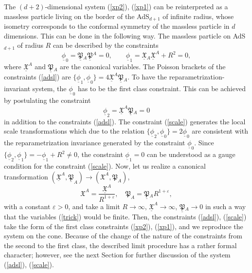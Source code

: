 \documentclass[a4paper,12pt]{article}
\def\X{\mathfrak X}
\def\P{\mathfrak P}
\begin{document}
The $(d+2)$-dimensional system
(\ref{xp2}), (\ref{xp1})
can be reinterpreted
as a massless particle living on
the
border of the AdS${}_{d+1}$ of infinite radius,
whose isometry corresponds to the
conformal symmetry of the massless particle
in $d$ dimensions.
This can be done in the following way.
The massless particle
on AdS${}_{d+1}$ of radius $R$
can be described by the
constraints
\begin{equation}
\underline{\phi}_0=\underline{\P}{}_A
\underline{\P}{}^A=0,\qquad
\underline{\phi}_1=\underline{\X}{}_A\underline{\X}^A+R^2=0,
\label{adsl}
\end{equation}
where $\underline{\X}^A$ and
$\underline{\P}{}_A$ are the canonical variables.
The Poisson brackets of
the constraints (\ref{adsl})
are $\{\underline{\phi}_1,\underline{\phi}_0\}=
4\underline{\X}^A\underline{\P}{}_A$.
To have the reparametrization-invariant system,
the $\underline{ \phi}_0$ has to be
the first class constraint.
This can be achieved by
postulating the constraint
\begin{equation}
\underline{\phi}_2=\underline{\X}^A\underline{\P}{}_A=0
\label{scale}
\end{equation}
in addition to the constraints (\ref{adsl}).
The constraint (\ref{scale}) generates
the local scale transformations
which due to the relation $\{\underline{\phi}_2,
\underline{\phi}_0\}=2\underline{\phi}_0$
are consistent with the
reparametrization invariance
generated by the constraint $\underline{\phi}_0$.
Since
$\{\underline{\phi}_2,
\underline{\phi}_1\}=-\underline{\phi}_1+R^2\neq0$,
the constraint $\underline{\phi}_1=0$ can be understood
as a gauge condition for the constraint
(\ref{scale}).
Now, let us realize a canonical transformation
$(\underline{\X}^A,\underline{\P}_A)
\rightarrow
(\X^A,\P_A)$,
\begin{equation}
\X^A=\frac{\underline{\X}^A}{R^{1+\varepsilon}},
\quad
\P_A=\underline{\P}{}_AR^{1+\varepsilon},
\label{trick}
\end{equation}
with a constant $\varepsilon>0$,
and take a limit $R\rightarrow\infty$,
$\underline{\X}^A\rightarrow\infty$,
$\underline{\P}{}_A\rightarrow 0$
in such a way that the variables
(\ref{trick}) would be finite.
Then, the constraints
(\ref{adsl}), (\ref{scale}) take the form
of the first class constraints (\ref{xp2}), (\ref{xp1}),
and we reproduce the
system on the cone.
Because of the change of the nature
of the constraints from the second
to the first class,
the described limit procedure
has a rather formal character;
however, see the next Section for further discussion of
the system (\ref{adsl}), (\ref{scale}).
\end{document}
